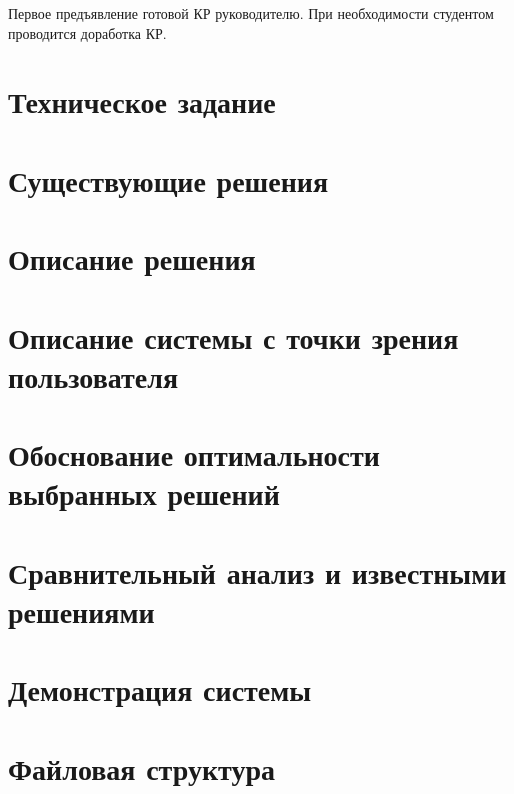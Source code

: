 \documentclass[letterpaper,10pt,russian]{sphinxmanual}
\begin{document}
 Первое предъявление готовой КР руководителю. При необходимости студентом проводится доработка КР.


\chapter{Техническое задание}
\label{\detokenize{specification::doc}}\label{\detokenize{specification:id1}}

\chapter{Существующие решения}
\label{\detokenize{competitors::doc}}\label{\detokenize{competitors:id1}}

\chapter{Описание решения}
\label{\detokenize{solution::doc}}\label{\detokenize{solution:id1}}

\chapter{Описание системы с точки зрения пользователя}
\label{\detokenize{user_view::doc}}\label{\detokenize{user_view:id1}}

\chapter{Обоснование оптимальности выбранных решений}
\label{\detokenize{rationale::doc}}\label{\detokenize{rationale:id1}}

\chapter{Сравнительный анализ и известными решениями}
\label{\detokenize{comparison::doc}}\label{\detokenize{comparison:id1}}

\chapter{Демонстрация системы}
\label{\detokenize{demonstration::doc}}\label{\detokenize{demonstration:id1}}

\chapter{Файловая структура}
\label{\detokenize{files::doc}}\label{\detokenize{files:id1}}
\end{document}
